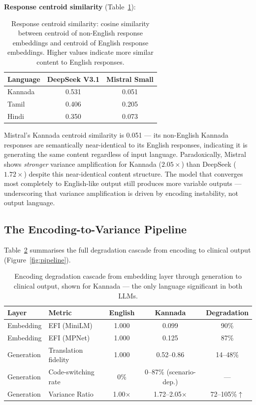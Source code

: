 \documentclass[11pt,a4paper]{article}
\begin{document}
\textbf{Response centroid similarity} (Table~\ref{tab:fidelity}):

\begin{table}[H]
\centering
\caption{Response centroid similarity: cosine similarity between centroid of non-English response embeddings and centroid of English response embeddings. Higher values indicate more similar content to English responses.}
\label{tab:fidelity}
\begin{tabular}{lcc}
\toprule
\textbf{Language} & \textbf{DeepSeek V3.1} & \textbf{Mistral Small} \\
\midrule
Kannada  & 0.531 & 0.051 \\
Tamil    & 0.406 & 0.205 \\
Hindi    & 0.350 & 0.073 \\
\bottomrule
\end{tabular}
\end{table}

Mistral's Kannada centroid similarity is 0.051 --- its non-English Kannada responses are semantically near-identical to its English responses, indicating it is generating the same content regardless of input language. Paradoxically, Mistral shows \emph{stronger} variance amplification for Kannada ($2.05\times$) than DeepSeek ($1.72\times$) despite this near-identical content structure. The model that converges most completely to English-like output still produces more variable outputs --- underscoring that variance amplification is driven by encoding instability, not output language.

\subsection{The Encoding-to-Variance Pipeline}

Table~\ref{tab:pipeline} summarises the full degradation cascade from encoding to clinical output (Figure~\ref{fig:pipeline}).

\begin{table}[H]
\centering
\caption{Encoding degradation cascade from embedding layer through generation to clinical output, shown for Kannada --- the only language significant in both LLMs.}
\label{tab:pipeline}
\begin{tabular}{llccc}
\toprule
\textbf{Layer} & \textbf{Metric} & \textbf{English} & \textbf{Kannada} & \textbf{Degradation} \\
\midrule
Embedding  & EFI (MiniLM)          & 1.000  & 0.099 & 90\% \\
Embedding  & EFI (MPNet)           & 1.000  & 0.125 & 87\% \\
Generation & Translation fidelity  & 1.000  & 0.52--0.86 & 14--48\% \\
Generation & Code-switching rate   & 0\%    & 0--87\% (scenario-dep.)   & --- \\
Generation & Variance Ratio        & 1.00$\times$ & 1.72--2.05$\times$ & 72--105\%$\uparrow$ \\
\bottomrule
\end{tabular}
\end{table}
\end{document}
